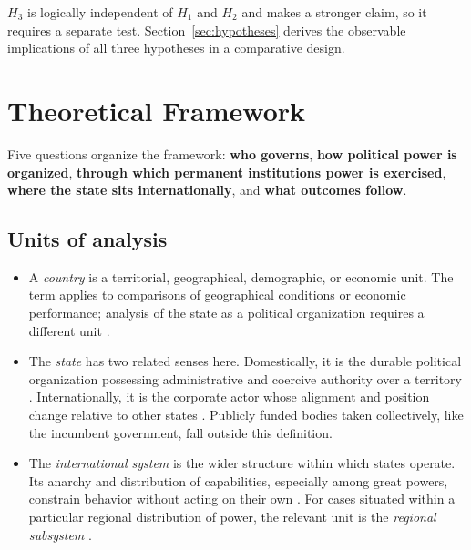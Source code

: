 \documentclass[11pt]{article}
\begin{document}
$H_3$ is logically independent of $H_1$ and $H_2$ and makes a stronger claim, so it requires a separate test. Section~\ref{sec:hypotheses} derives the observable implications of all three hypotheses in a comparative design.

\section{Theoretical Framework}
\label{sec:framework}

Five questions organize the framework: \textbf{who governs}, \textbf{how political power is organized}, \textbf{through which permanent institutions power is exercised}, \textbf{where the state sits internationally}, and \textbf{what outcomes follow}.

\subsection{Units of analysis}

\begin{itemize}
	\item A \emph{country} is a territorial, geographical, demographic, or economic unit. The term applies to comparisons of geographical conditions or economic performance; analysis of the state as a political organization requires a different unit \parencite{linz_stepan_1996,waltz_1979}.
	\item The \emph{state} has two related senses here. Domestically, it is the durable political organization possessing administrative and coercive authority over a territory \parencite{weber1922wirtschaft,hobbes1651leviathan}. Internationally, it is the corporate actor whose alignment and position change relative to other states \parencite{waltz_1979,mearsheimer_2001}. Publicly funded bodies taken collectively, like the incumbent government, fall outside this definition.
	\item The \emph{international system} is the wider structure within which states operate. Its anarchy and distribution of capabilities, especially among great powers, constrain behavior without acting on their own \parencite{waltz_1979,mearsheimer_2001}. For cases situated within a particular regional distribution of power, the relevant unit is the \emph{regional subsystem} \parencite{buzan_waever_2003}.
\end{itemize}
\end{document}
